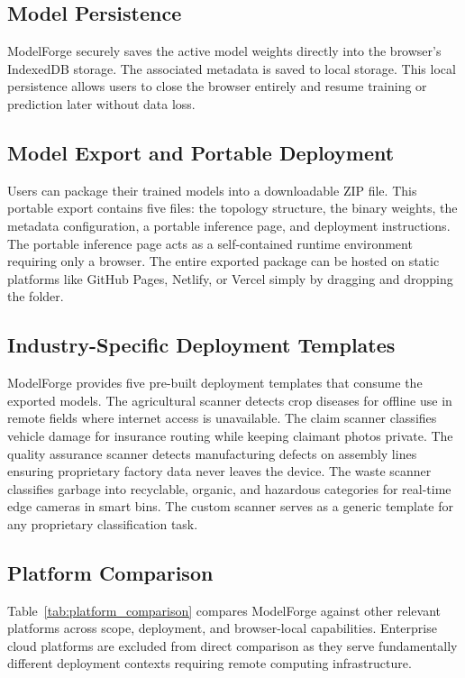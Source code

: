 \documentclass[conference]{IEEEtran}
\begin{document}
\subsection{Model Persistence}
ModelForge securely saves the active model weights directly into the browser's IndexedDB storage. The associated metadata is saved to local storage. This local persistence allows users to close the browser entirely and resume training or prediction later without data loss.

\subsection{Model Export and Portable Deployment}
Users can package their trained models into a downloadable ZIP file. This portable export contains five files: the topology structure, the binary weights, the metadata configuration, a portable inference page, and deployment instructions. The portable inference page acts as a self-contained runtime environment requiring only a browser. The entire exported package can be hosted on static platforms like GitHub Pages, Netlify, or Vercel simply by dragging and dropping the folder.

\subsection{Industry-Specific Deployment Templates}
ModelForge provides five pre-built deployment templates that consume the exported models. The agricultural scanner detects crop diseases for offline use in remote fields where internet access is unavailable. The claim scanner classifies vehicle damage for insurance routing while keeping claimant photos private. The quality assurance scanner detects manufacturing defects on assembly lines ensuring proprietary factory data never leaves the device. The waste scanner classifies garbage into recyclable, organic, and hazardous categories for real-time edge cameras in smart bins. The custom scanner serves as a generic template for any proprietary classification task.

\subsection{Platform Comparison}

Table~\ref{tab:platform_comparison} compares ModelForge against other relevant platforms across scope, deployment, and browser-local capabilities. Enterprise cloud platforms are excluded from direct comparison as they serve fundamentally different deployment contexts requiring remote computing infrastructure.
\end{document}
